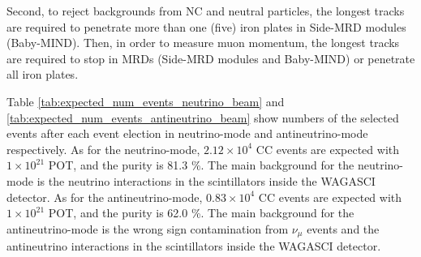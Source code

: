 Second, to reject backgrounds from NC and neutral particles, the longest tracks are required to penetrate more than one (five) iron plates in Side-MRD modules (Baby-MIND). 
Then, in order to measure muon momentum, the longest tracks are required to stop in MRDs (Side-MRD modules and Baby-MIND) or penetrate all iron plates.




Table \ref{tab:expected_num_events_neutrino_beam} and \ref{tab:expected_num_events_antineutrino_beam}  show numbers of the selected events after each event election in neutrino-mode and antineutrino-mode respectively.
As for the neutrino-mode, $2.12 \times 10^{4}$ CC events are expected with $1 \times 10^{21}$  POT, and the purity is 81.3 \%.
The main background for the neutrino-mode is the neutrino interactions in the scintillators inside the WAGASCI detector.
As for the antineutrino-mode, $0.83 \times 10^{4}$ CC events are expected with $1 \times 10^{21}$  POT, and the purity is 62.0 \%.
The main background for the antineutrino-mode is the wrong sign contamination from $\nu_{\mu}$ events and the antineutrino interactions in the scintillators inside the WAGASCI detector.

